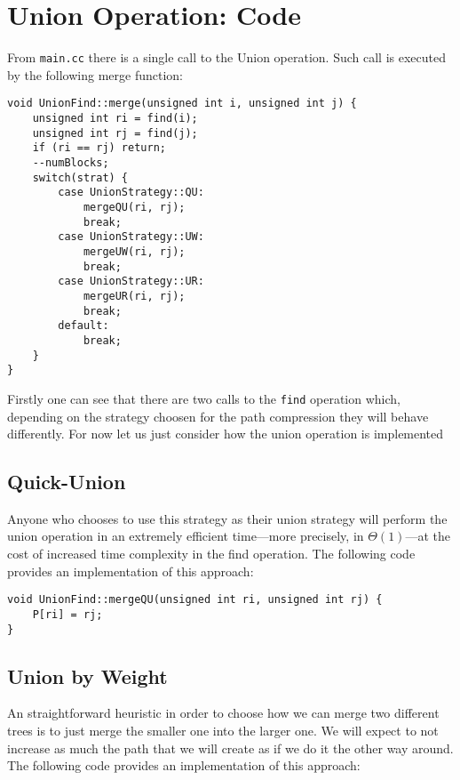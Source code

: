 \appendix
\section{Union Operation: Code}
From \texttt{main.cc} there is a single call to the Union operation. Such call is executed by the following merge function:

\begin{center}
    \begin{verbatim}
void UnionFind::merge(unsigned int i, unsigned int j) {
    unsigned int ri = find(i);
    unsigned int rj = find(j);
    if (ri == rj) return;
    --numBlocks;
    switch(strat) {
        case UnionStrategy::QU:
            mergeQU(ri, rj);
            break;
        case UnionStrategy::UW:
            mergeUW(ri, rj);
            break;
        case UnionStrategy::UR:
            mergeUR(ri, rj);
            break;
        default:
            break;
    }
}
    \end{verbatim}
\end{center}

Firstly one can see that there are two calls to the \texttt{find} operation which, depending on the strategy choosen for the path compression they will behave differently. For now let us just consider how the union operation is implemented 

\subsection{Quick-Union}
Anyone who chooses to use this strategy as their union strategy will perform the union operation in an extremely efficient time—more precisely, in $\Theta(1)$—at the cost of increased time complexity in the find operation. The following code provides an implementation of this approach:

\begin{center}
    \begin{verbatim}
void UnionFind::mergeQU(unsigned int ri, unsigned int rj) {
    P[ri] = rj;
}
    \end{verbatim}
\end{center}

\subsection{Union by Weight}
An straightforward heuristic in order to choose how we can merge two different trees is to just merge the smaller one into the larger one. We will expect to not increase as much the path that we will create as if we do it the other way around. The following code provides an implementation of this approach:

